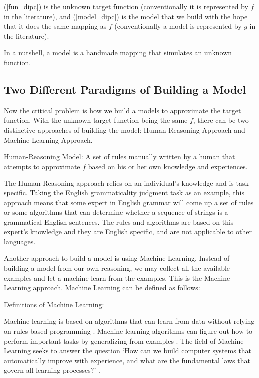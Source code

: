 \documentclass[final]{ua-thesis}
\numberwithin{equation}{section}
\begin{document}
(\ref{fun_dipc}) is the unknown target function (conventionally it is represented by $f$ in the literature), and (\ref{model_dipc}) is the model that we build with the hope that it does the same mapping as $f$ (conventionally a model is represented by $g$ in the literature).

In a nutshell, a model is a handmade mapping that simulates an unknown function. 

\subsection{Two Different Paradigms of Building a Model}

Now the critical problem is how we build a models to approximate the target function. With the unknown target function being the same $f$, there can be two distinctive approaches of building the model: Human-Reasoning Approach and Machine-Learning Approach. 

\begin{exe}
\ex Human-Reasoning Model:
A set of rules manually written by a human that attempts to approximate $f$ based on his or her own knowledge and experiences. 
\end{exe}

The Human-Reasoning approach relies on an individual's knowledge and is task-specific. 
Taking the English grammaticality judgment task as an example, this approach means that some expert in English grammar will come up a set of rules or some algorithms that can determine whether a sequence of strings is a grammatical English sentences. 
The rules and algorithms are based on this expert's knowledge and they are English specific, and are not applicable to other languages.     

Another approach to build a model is using Machine Learning. Instead of building a model from our own reasoning, we may collect all the available examples and let a machine learn from the examples. This is the Machine Learning approach. 
Machine Learning can be defined as follows:

\begin{exe}
\ex Definitions of Machine Learning:
\begin{xlist}
	\ex Machine learning is based on algorithms that can learn from data without relying on rules-based programming \citep{pyle2015executive}. 
	\ex Machine learning algorithms can figure out how to perform important tasks by generalizing from examples \citep{domingos2012few}.
	\ex The field of Machine Learning seeks to answer the question `How can we build computer systems that automatically improve with experience, and what are the fundamental laws that govern all learning processes?' \citep{mitchell2006discipline}.
\end{xlist}
\end{exe}   
\end{document}

